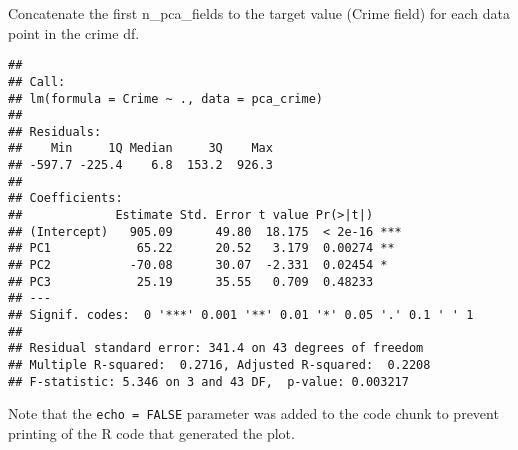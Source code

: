 \documentclass[]{article}
\newenvironment{Shaded}{\begin{snugshade}}{\end{snugshade}}
\newcommand{\KeywordTok}[1]{\textcolor[rgb]{0.13,0.29,0.53}{\textbf{#1}}}
\newcommand{\DataTypeTok}[1]{\textcolor[rgb]{0.13,0.29,0.53}{#1}}
\newcommand{\DecValTok}[1]{\textcolor[rgb]{0.00,0.00,0.81}{#1}}
\newcommand{\StringTok}[1]{\textcolor[rgb]{0.31,0.60,0.02}{#1}}
\newcommand{\OperatorTok}[1]{\textcolor[rgb]{0.81,0.36,0.00}{\textbf{#1}}}
\newcommand{\NormalTok}[1]{#1}
\begin{document}
Concatenate the first n\_pca\_fields to the target value (Crime field)
for each data point in the crime df.

\begin{Shaded}
\end{Shaded}

\begin{verbatim}
## 
## Call:
## lm(formula = Crime ~ ., data = pca_crime)
## 
## Residuals:
##    Min     1Q Median     3Q    Max 
## -597.7 -225.4    6.8  153.2  926.3 
## 
## Coefficients:
##             Estimate Std. Error t value Pr(>|t|)    
## (Intercept)   905.09      49.80  18.175  < 2e-16 ***
## PC1            65.22      20.52   3.179  0.00274 ** 
## PC2           -70.08      30.07  -2.331  0.02454 *  
## PC3            25.19      35.55   0.709  0.48233    
## ---
## Signif. codes:  0 '***' 0.001 '**' 0.01 '*' 0.05 '.' 0.1 ' ' 1
## 
## Residual standard error: 341.4 on 43 degrees of freedom
## Multiple R-squared:  0.2716, Adjusted R-squared:  0.2208 
## F-statistic: 5.346 on 3 and 43 DF,  p-value: 0.003217
\end{verbatim}

Note that the \texttt{echo\ =\ FALSE} parameter was added to the code
chunk to prevent printing of the R code that generated the plot.
\end{document}
